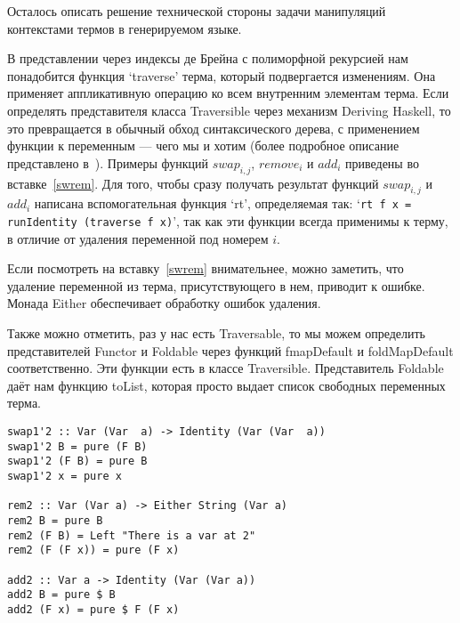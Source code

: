 Осталось описать решение технической стороны задачи манипуляций контекстами термов в генерируемом языке.

В представлении через индексы де Брейна с полиморфной рекурсией нам понадобится функция `traverse' терма, который подвергается изменениям. Она применяет аппликативную операцию ко всем внутренним элементам терма. Если определять представителя класса Traversible через механизм Deriving Haskell\cite{deriveFun}, то это превращается в обычный обход синтаксического дерева, с применением функции к переменным --- чего мы и хотим (более подробное описание представлено в~\cite{bound}). Примеры функций $swap_{i,j}$, $remove_i$ и $add_i$ приведены во вставке~\ref{swrem}. Для того, чтобы сразу получать результат функций $swap_{i,j}$ и $add_i$ написана вспомогательная функция `rt', определяемая так: `\lstinline{rt f x = runIdentity (traverse f x)}', так как эти функции всегда применимы к терму, в отличие от удаления переменной под номерем $i$.

Если посмотреть на вставку~\ref{swrem} внимательнее, можно заметить, что удаление переменной из терма, присутствующего в нем, приводит к ошибке. Монада Either обеспечивает обработку ошибок удаления.

Также можно отметить, раз у нас есть Traversable, то мы можем определить представителей Functor и Foldable через функций fmapDefault и foldMapDefault соответственно. Эти функции есть в классе Traversible. Представитель Foldable даёт нам функцию toList, которая просто выдает список свободных переменных терма.

\begin{lstlisting}[label={swrem}, caption={Примеры функций $swap_{i,j}$, $remove_i$ и $add_i$},captionpos=b, frame=single, float, floatplacement=H]
swap1'2 :: Var (Var  a) -> Identity (Var (Var  a))
swap1'2 B = pure (F B)
swap1'2 (F B) = pure B
swap1'2 x = pure x

rem2 :: Var (Var a) -> Either String (Var a)
rem2 B = pure B
rem2 (F B) = Left "There is a var at 2"
rem2 (F (F x)) = pure (F x)

add2 :: Var a -> Identity (Var (Var a))
add2 B = pure $ B
add2 (F x) = pure $ F (F x)
\end{lstlisting}







